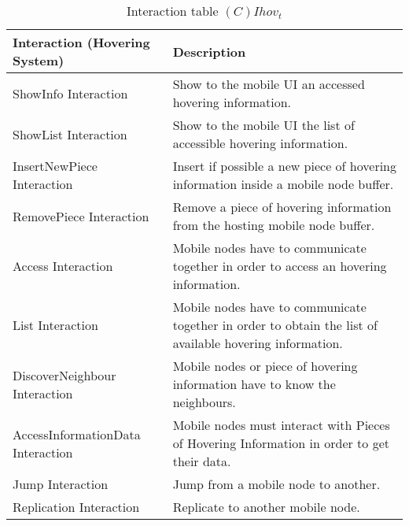 \begin{table}[H]
	\centering
	\begin{tabular}{|p{4cm}|p{8cm}|}
			\hline
			\textbf{Interaction (Hovering System)} & \textbf{Description} \\
			\hline
			ShowInfo Interaction & Show to the mobile UI an accessed hovering
			information. \\
			\hline
			ShowList Interaction & Show to the mobile UI the list of accessible hovering
			information. \\
			\hline
			InsertNewPiece Interaction & Insert if possible a new piece of hovering
			information inside a mobile node buffer. \\
			\hline
			RemovePiece Interaction & Remove a piece of hovering information from the
			hosting mobile node buffer. \\
			\hline
			Access Interaction & Mobile nodes have to communicate together in order to
			access an hovering information. \\
			\hline
			List Interaction & Mobile nodes have to communicate together in order to
			obtain the list of available hovering information. \\
			\hline
			DiscoverNeighbour Interaction & Mobile nodes or piece of hovering
			information have to know the neighbours. \\
			\hline
			\hline
			AccessInformationData Interaction & Mobile nodes must interact with Pieces
			of Hovering Information in order to get their data. \\
			\hline
			Jump Interaction & Jump from a mobile node to another. \\
			\hline
			Replication Interaction & Replicate to another mobile node. \\
			\hline
		\end{tabular}
	\caption{Interaction table $(C)Ihov_t$}
	\label{tab:cihovt}
\end{table}

